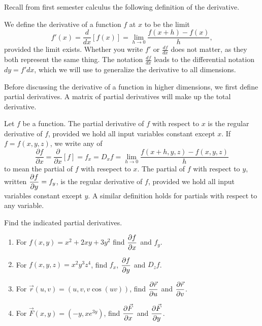 Recall from first semester calculus the following definition of the derivative.
\begin{dfn}
We define the derivative of a function $f$ at $x$ to be the limit
$$f'(x)=\frac{d}{dx}[f(x)]=\lim_{h\to 0}\frac{f(x+h)-f(x)}{h},$$
provided the limit exists. Whether you write $f'$ or $\frac{df}{dx}$ does not matter, as they both represent the same thing.  The notation $\frac{df}{dx}$ leads to the differential notation $dy=f'dx$, which we will use to generalize the derivative to all dimensions.
\end{dfn}
Before discussing the derivative of a function in higher dimensions, we first define partial derivatives. A matrix of partial derivatives will make up the total derivative.
\begin{dfn}
 Let $f$ be a function.  The partial derivative of $f$ with respect to $x$ is the regular derivative of $f$, provided we hold all input variables constant except $x$.  If $f=f(x,y,z)$, we write any of 
 $$\frac{\partial f}{\partial x}=\frac{\partial}{\partial x}[f]=f_x = D_x f=\lim_{h\to 0}\frac{f(x+h,y,z)-f(x,y,z)}{h}$$
to mean the partial of $f$ with resepect to $x$.
 The partial of $f$ with respect to $y$, written $\displaystyle \frac{\partial f}{\partial y}=f_y$, is the regular derivative of $f$, provided we hold all input variables constant except $y$. A similar definition holds for partials with respect to any variable.
\end{dfn}

\begin{problem}%
 Find the indicated partial derivatives.
\begin{enumerate}
 \item For $f(x,y)=x^2+2xy+3y^2$ find $\displaystyle\frac{\partial f}{\partial x}$ and $f_y$.
 \item For $f(x,y,z)=x^2y^3z^4$, find $f_x$, $\displaystyle\frac{\partial f}{\partial y}$ and $D_z f$.
 \item For $\vec r(u,v) = (u,v,v\cos(uv))$, find $\displaystyle\frac{\partial \vec r}{\partial u}$ and $\displaystyle\frac{\partial \vec r}{\partial v}$. 
 \item For $\vec F(x,y) = (-y,xe^{3y})$, find $\displaystyle\frac{\partial \vec F}{\partial x}$ and $\displaystyle\frac{\partial \vec F}{\partial y}$.
\end{enumerate}
\end{problem}


